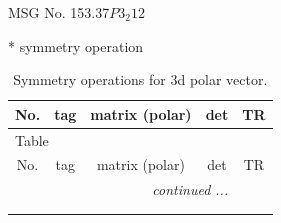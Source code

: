 \documentclass[fleqn,8pt]{jsarticle}
\begin{document}
\setcounter{MaxMatrixCols}{32}

\renewcommand{\tablename}{Table~}
\renewcommand{\figurename}{Figure~}
\begin{center}
\LARGE
MSG No. 153.37\quad$P3_{2}12$
\end{center}
* symmetry operation
\renewcommand{\arraystretch}{1.3}
\begin{longtable}{ccccc}
\caption{Symmetry operations for 3d polar vector.}
 \\
 \hline \hline
No. & tag & matrix (polar) & det & TR \\ \hline \endfirsthead

\multicolumn{4}{l}{\tablename\ \thetable{}} \\
 \hline \hline
No. & tag & matrix (polar) & det & TR \\ \hline \endhead

 \hline \hline
\multicolumn{4}{r}{\footnotesize\it continued ...} \\ \endfoot

 \hline \hline
\multicolumn{4}{r}{} \\ \endlastfoot


\end{longtable}
\end{document}
